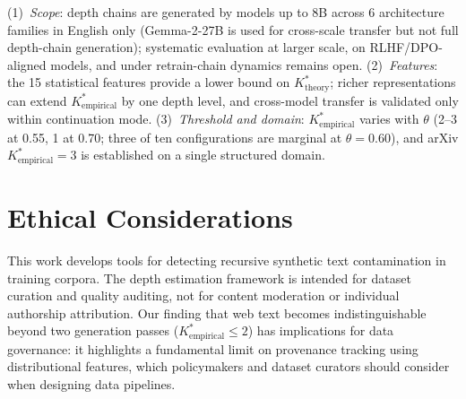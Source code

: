 \documentclass[11pt]{article}
\newcommand{\Kempirical}{{K^*_{\text{empirical}}}}
\newcommand{\Ktheory}{{K^*_{\text{theory}}}}
\begin{document}
(1)~\emph{Scope}: depth chains are generated by models up to 8B across 6 architecture families in English only (Gemma-2-27B is used for cross-scale transfer but not full depth-chain generation); systematic evaluation at larger scale, on RLHF/DPO-aligned models, and under retrain-chain dynamics remains open.
(2)~\emph{Features}: the 15 statistical features provide a lower bound on $\Ktheory$; richer representations can extend $\Kempirical$ by one depth level, and cross-model transfer is validated only within continuation mode.
(3)~\emph{Threshold and domain}: $\Kempirical$ varies with $\theta$ (2--3 at 0.55, 1 at 0.70; three of ten configurations are marginal at $\theta{=}0.60$), and arXiv $\Kempirical{=}3$ is established on a single structured domain.

\section*{Ethical Considerations}

This work develops tools for detecting recursive synthetic text contamination in training corpora.
The depth estimation framework is intended for dataset curation and quality auditing, not for content moderation or individual authorship attribution.
Our finding that web text becomes indistinguishable beyond two generation passes ($\Kempirical \leq 2$) has implications for data governance: it highlights a fundamental limit on provenance tracking using distributional features, which policymakers and dataset curators should consider when designing data pipelines.





\end{document}
